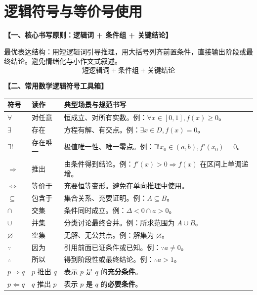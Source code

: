 \documentclass[11pt,a4paper]{ctexart}
\newcommand{\teachblock}[2]{%
  \par\addvspace{0.55em}%
  \noindent\textbf{【#1】}\par\nobreak
  \begingroup
    \raggedright
    \setlength{\parskip}{0.35em}%
    #2\par
  \endgroup
}
\begin{document}
\newpage

\section{逻辑符号与等价号使用}

\teachblock{一、核心书写原则：逻辑词 + 条件组 + 关键结论}{
  最优表达结构：用短逻辑词引导推理，用大括号列齐前置条件，直接输出阶段或最终结论。避免情绪化与小作文式叙述。
  \[
    \boxed{\text{短逻辑词} + \text{条件组} + \text{关键结论}}
  \]
}

\teachblock{二、常用数学逻辑符号工具箱}{
  \renewcommand{\arraystretch}{1.4}
  \begin{tabularx}{\textwidth}{p{2.2cm}p{2.2cm}X}
  \toprule
  符号 & 读作 & 典型场景与规范书写\\
  \midrule
  \(\forall\) & 对任意 & 恒成立、对所有实数。例：\(\forall x \in [0,1], f(x) \ge 0\)。\\ \hline
  \(\exists\) & 存在 & 方程有解、有交点。例：\(\exists x \in D, f(x) = 0\)。\\ \hline
  \(\exists!\) & 存在唯一 & 极值唯一性、唯一零点。例：\(\exists! x_0 \in (a, b), f'(x_0) = 0\)。\\ \hline
  \(\Rightarrow\) & 推出 & 由条件得到结论。例：\(f'(x) > 0 \Rightarrow f(x)\) 在区间上单调递增。\\ \hline
  \(\Leftrightarrow\) & 等价于 & 充要恒等变形。避免在单向推理中使用。\\ \hline
  \(\subseteq\) & 包含于 & 集合关系、充要证明。例：\(A \subseteq B\)。\\ \hline
  \(\cap\) & 交集 & 条件同时成立。例：\(\Delta < 0 \cap a > 0\)。\\ \hline
  \(\cup\) & 并集 & 分类讨论最终合并。例：所求范围为 \(A \cup B\)。\\ \hline
  \(\varnothing\) & 空集 & 无解、无公共点。例：解集为 \(\varnothing\)。\\ \hline
  \(\because\) & 因为 & 引用前面已证条件或已知。例：\(\because a \neq 0\)。\\ \hline
  \(\therefore\) & 所以 & 得到阶段性或最终结论。例：\(\therefore a > 1\)。\\ \hline
  \(p \Rightarrow q\) & \(p\) 推出 \(q\) & 表示 \(p\) 是 \(q\) 的\textbf{充分条件}。\\ \hline
  \(p \Leftarrow q\) & \(q\) 推出 \(p\) & 表示 \(p\) 是 \(q\) 的\textbf{必要条件}。\\
  \bottomrule
  \end{tabularx}
}
\end{document}
